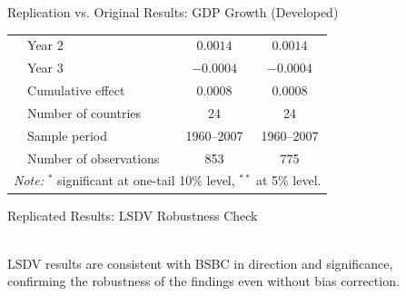 \documentclass[10pt, aspectratio=169]{beamer}
\begin{document}
\begin{frame}{Replication vs. Original Results: GDP Growth (Developed)}
\begin{table}
{\begin{tabular}{llcc}
                        & Year 2            & $0.0014$  & $0.0014$ \\
                        & Year 3            & $-0.0004$ & $-0.0004$ \\
                        & Cumulative effect & $0.0008$  & $0.0008$ \\
            \midrule
                        & Number of countries    & 24         & 24 \\
                        & Sample period          & 1960--2007 & 1960--2007 \\
                        & Number of observations & 853        & 775 \\
            \bottomrule
            \multicolumn{4}{l}{\scriptsize \textit{Note:} $^{*}$ significant at one-tail 10\% level, $^{**}$ at 5\% level.}
        \end{tabular} }
    \end{table}
\end{frame}
\begin{frame}{Replicated Results: LSDV Robustness Check}

\begin{table}[h]
\centering
\caption{\small Mean responses of GDP growth (developing countries)}
\vspace{-0.3em}
\vspace{0.2em} \\
\footnotesize{LSDV results are consistent with BSBC in direction and significance,\\confirming the robustness of the findings even without bias correction.}
\end{table}
\end{frame}
\end{document}
